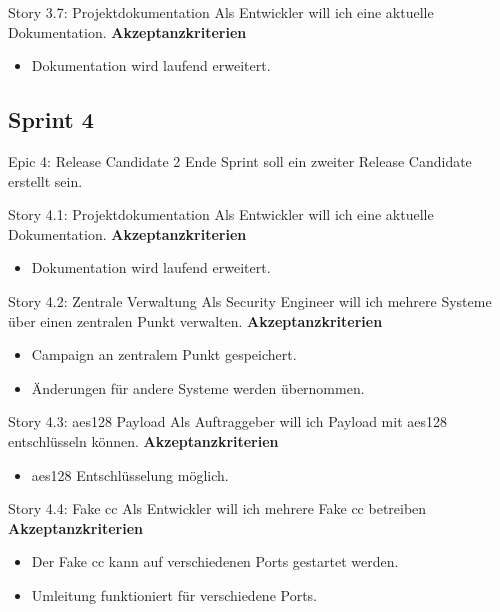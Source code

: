 \begin{story}{Story 3.7:  Projektdokumentation}
  Als Entwickler will ich eine aktuelle Dokumentation.
    \tcblower
  \textbf{Akzeptanzkriterien}
  \begin{itemize}
  	\item Dokumentation wird laufend erweitert.
  \end{itemize}
\end{story}

\subsection{Sprint 4}

\begin{epic}{Epic 4: Release Candidate 2}
  Ende Sprint soll ein zweiter Release Candidate erstellt sein.
\end{epic}


\begin{story}{Story 4.1:  Projektdokumentation}
  Als Entwickler will ich eine aktuelle Dokumentation.
  \tcblower
  \textbf{Akzeptanzkriterien}
  \begin{itemize}
  	\item Dokumentation wird laufend erweitert.
  \end{itemize}
\end{story}

\begin{story}{Story 4.2:  Zentrale Verwaltung}
  Als Security Engineer will ich mehrere Systeme über einen zentralen Punkt verwalten.
  \tcblower
  \textbf{Akzeptanzkriterien}
  \begin{itemize}
  	\item Campaign an zentralem Punkt gespeichert.
  	\item Änderungen für andere Systeme werden übernommen.
  \end{itemize}
\end{story}


\begin{story}{Story 4.3:  \gls{aes128} Payload}
  Als Auftraggeber will ich Payload mit \gls{aes128} entschlüsseln können.
  \tcblower
  \textbf{Akzeptanzkriterien}
  \begin{itemize}
  	\item \gls{aes128} Entschlüsselung möglich.
  \end{itemize}
\end{story}


\begin{story}{Story 4.4:  Fake \gls{cc}}
  Als Entwickler will ich mehrere Fake \gls{cc} betreiben
  \tcblower
  \textbf{Akzeptanzkriterien}
  \begin{itemize}
  	\item Der Fake \gls{cc} kann auf verschiedenen Ports gestartet werden.
  	\item Umleitung funktioniert für verschiedene Ports.
  \end{itemize}
\end{story}



